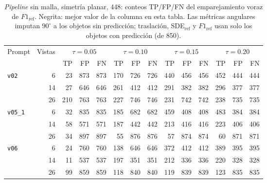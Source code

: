 \begin{table}[htbp]
\centering
\caption{\textit{Pipeline} sin malla, simetría planar, 448: conteos TP/FP/FN del emparejamiento voraz de $F1_{\mathrm{ref}}$. Negrita: mejor valor de la columna en esta tabla. Las métricas angulares imputan $90^\circ$ a los objetos sin predicción; traslación, SDE$_{\mathrm{ref}}$ y $F1_{\mathrm{ref}}$ usan solo los objetos con predicción (de 850).}
\label{tab:plane_448_conteos}
\begin{adjustbox}{max width=\textwidth}
\begin{tabular}{lrrrrrrrrrrrrr}
\toprule
\multirow{2}{*}{Prompt} & \multirow{2}{*}{Vistas} & \multicolumn{3}{c}{$\tau{=}0.05$} & \multicolumn{3}{c}{$\tau{=}0.10$} & \multicolumn{3}{c}{$\tau{=}0.15$} & \multicolumn{3}{c}{$\tau{=}0.20$} \\
\cmidrule(lr){3-5} \cmidrule(lr){6-8} \cmidrule(lr){9-11} \cmidrule(lr){12-14}
 &  & TP & FP & FN & TP & FP & FN & TP & FP & FN & TP & FP & FN \\
\midrule
\multirow{3}{*}{\texttt{v02}} & 6 & 23 & 873 & 873 & 170 & 726 & 726 & 440 & 456 & 456 & 452 & 444 & 444 \\
 & 14 & 27 & 646 & 646 & 261 & 412 & 412 & 291 & 382 & 382 & 296 & 377 & 377 \\
 & 26 & 210 & 763 & 763 & 227 & 746 & 746 & 231 & 742 & 742 & 238 & 735 & 735 \\
\midrule
\multirow{3}{*}{\texttt{v05\_1}} & 6 & 32 & 835 & 835 & 185 & 682 & 682 & 459 & 408 & 408 & 483 & 384 & 384 \\
 & 14 & 58 & 571 & 571 & 187 & 442 & 442 & 213 & 416 & 416 & 223 & 406 & 406 \\
 & 26 & 34 & 897 & 897 & 55 & 876 & 876 & 57 & 874 & 874 & 60 & 871 & 871 \\
\midrule
\multirow{3}{*}{\texttt{v06}} & 6 & 24 & 760 & 760 & 138 & 646 & 646 & 372 & 412 & 412 & 389 & 395 & 395 \\
 & 14 & 11 & 537 & 537 & 197 & 351 & 351 & 212 & 336 & 336 & 220 & 328 & 328 \\
 & 26 & 99 & 859 & 859 & 118 & 840 & 840 & 119 & 839 & 839 & 123 & 835 & 835 \\
\bottomrule
\end{tabular}
\end{adjustbox}
\end{table}
